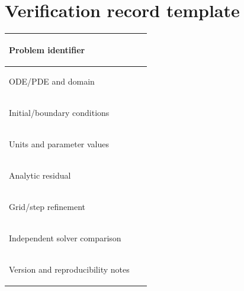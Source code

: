 \documentclass[11pt,letterpaper,oneside]{report}
\theoremstyle{definition}\newtheorem{definition}[theorem]{Definition}
\theoremstyle{remark}\newtheorem{remark}[theorem]{Remark}
\begin{document}
\section*{Verification record template}
\begin{tabularx}{\textwidth}{>{\bfseries\raggedright\arraybackslash}p{}X}\toprule
Problem identifier & \rule{0pt}{15pt}\ \\ \midrule
ODE/PDE and domain & \\[8pt]
Initial/boundary conditions & \\[8pt]
Units and parameter values & \\[8pt]
Analytic residual & \\ [8pt]
Grid/step refinement & \\ [8pt]
Independent solver comparison & \\ [8pt]
Version and reproducibility notes & \\ [8pt]\bottomrule
\end{tabularx}
\end{document}
